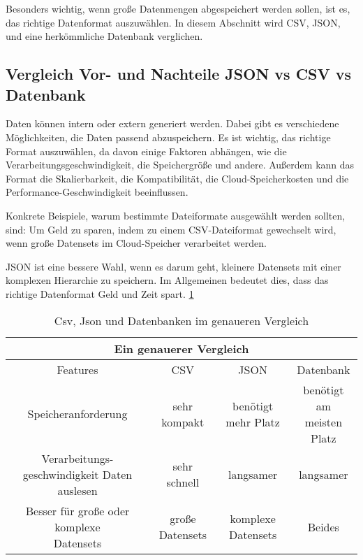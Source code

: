 Besonders wichtig, wenn große Datenmengen abgespeichert werden sollen, ist es, das richtige Datenformat auszuwählen. In diesem Abschnitt wird CSV, JSON, und eine herkömmliche Datenbank verglichen.

\subsection{Vergleich Vor- und Nachteile JSON vs CSV vs Datenbank}

Daten können intern oder extern generiert werden. Dabei gibt es verschiedene Möglichkeiten, die Daten passend abzuspeichern. Es ist wichtig, das richtige Format auszuwählen, da davon einige Faktoren abhängen, wie die Verarbeitungsgeschwindigkeit, die Speichergröße und andere. 
Außerdem kann das Format die Skalierbarkeit, die Kompatibilität, die Cloud-Speicherkosten und die Performance-Geschwindigkeit beeinflussen.

Konkrete Beispiele, warum bestimmte Dateiformate ausgewählt werden sollten, sind: Um Geld zu sparen, indem zu einem CSV-Dateiformat gewechselt wird, wenn große Datensets im Cloud-Speicher verarbeitet werden. 

JSON ist eine bessere Wahl, wenn es darum geht, kleinere Datensets mit einer komplexen Hierarchie zu speichern. 
Im Allgemeinen bedeutet dies, dass das richtige Datenformat Geld und Zeit spart. \cite{csvOrJson} \ref{tab:allgemein:csvJsonDatabase}

\begin{table}
    \centering
    \begin{tabular}{ |c|c|c|c| } 
     \hline
     \multicolumn{4}{|c|}{Ein genauerer Vergleich  } \\
     \hline
     \hline
     Features & CSV & JSON & Datenbank \\ 
     \hline 
     \hline
     Speicheranforderung & sehr kompakt & benötigt mehr Platz & \parbox[t][1cm]{3.5cm }{benötigt am \\ meisten Platz} \\ 
     \hline
     \parbox[t][1.5cm]{3.5cm }{Verarbeitungs-geschwindigkeit Daten auslesen} & sehr schnell & langsamer & langsamer \\ 
     \hline
     \parbox[t][1.5cm]{3.5cm }{Besser für große oder komplexe \\ Datensets}  & große Datensets & komplexe Datensets & Beides \\ 
     \hline
    \end{tabular} 
    \caption{Csv, Json und Datenbanken im genaueren Vergleich \cite{csvOrJson}}
    
    \label{tab:allgemein:csvJsonDatabase}
\end{table}

